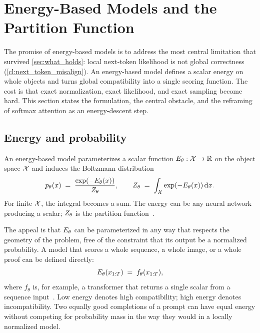
\section{Energy-Based Models and the Partition Function}
\label{sec:ebm_motivation}

The promise of energy-based models is to address the most central limitation that survived \cref{sec:what_holds}:
local next-token likelihood is not global correctness (\ref{cl:next_token_misalign}).
An energy-based model defines a scalar energy on whole objects and turns global compatibility into a single scoring function.
The cost is that exact normalization, exact likelihood, and exact sampling become hard.
This section states the formulation, the central obstacle, and the reframing of softmax attention as an energy-descent step.

\subsection{Energy and probability}
\label{ssec:ebm_definition}

An energy-based model parameterizes a scalar function $E_\theta : \mathcal{X} \to \mathbb{R}$ on the object space $\mathcal{X}$ and induces the Boltzmann distribution
\begin{equation}
  p_\theta(x) \;=\; \frac{\exp(-E_\theta(x))}{Z_\theta},
  \qquad
  Z_\theta \;=\; \int_{\mathcal{X}} \exp(-E_\theta(x))\, \mathrm{d}x.
  \label{eq:ebm_definition}
\end{equation}
For finite $\mathcal{X}$, the integral becomes a sum.
The energy can be any neural network producing a scalar;
$Z_\theta$ is the partition function~\citep{lecun2006tutorial,song2021train}.

The appeal is that $E_\theta$ can be parameterized in any way that respects the geometry of the problem, free of the constraint that its output be a normalized probability.
A model that scores a whole sequence, a whole image, or a whole proof can be defined directly:
\begin{equation}
  E_\theta(x_{1:T}) \;=\; f_\theta(x_{1:T}),
  \label{eq:sequence_ebm}
\end{equation}
where $f_\theta$ is, for example, a transformer that returns a single scalar from a sequence input~\citep{grathwohl2019your,du2019implicit}.
Low energy denotes high compatibility;
high energy denotes incompatibility.
Two equally good completions of a prompt can have equal energy without competing for probability mass in the way they would in a locally normalized model.


